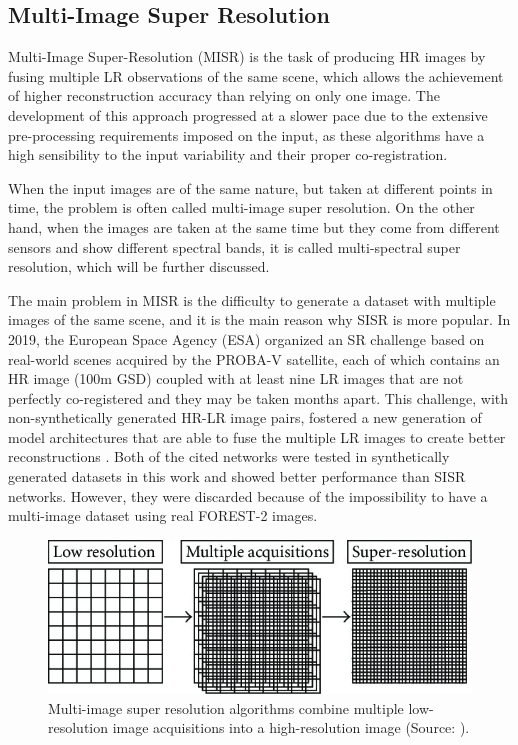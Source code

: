     \subsection{Multi-Image Super Resolution}

        Multi-Image Super-Resolution (MISR) is the task of producing HR images by fusing multiple LR observations of the same scene, which allows the achievement of higher reconstruction accuracy than relying on only one image.
        The development of this approach progressed at a slower pace due to the extensive pre-processing requirements imposed on the input, as these algorithms have a high sensibility to the input variability and their proper co-registration.  

        When the input images are of the same nature, but taken at different points in time, the problem is often called multi-image super resolution.
        On the other hand, when the images are taken at the same time but they come from different sensors and show different spectral bands, it is called multi-spectral super resolution, which will be further discussed. 

        The main problem in MISR is the difficulty to generate a dataset with multiple images of the same scene, and it is the main reason why SISR is more popular.
        In 2019, the European Space Agency (ESA) organized an SR challenge  \cite{martens2019superresolution} based on real-world scenes acquired by the PROBA-V satellite, each of which contains an HR image (100m GSD) coupled with at least nine LR images that are not perfectly co-registered and they may be taken months apart. 
        This challenge, with  non-synthetically generated HR-LR image pairs, fostered a new generation of model architectures that are able to fuse the multiple LR images to create better reconstructions \cite{Salvetti_2020,Bordone_Molini_2020}.
         Both of the cited networks were tested in synthetically generated datasets in this work and showed better performance than SISR networks. However, they were discarded because of the impossibility to have a multi-image dataset using real FOREST-2 images.

        \begin{figure}[H]
            \centering
            \includegraphics[width=\textwidth]{Includes/2-MISR.jpeg}
            \caption{Multi-image super resolution algorithms combine multiple low-resolution image acquisitions into a high-resolution image (Source: \cite{MISR2007}).}
            \label{fig:2-MISR}
        \end{figure}
        

